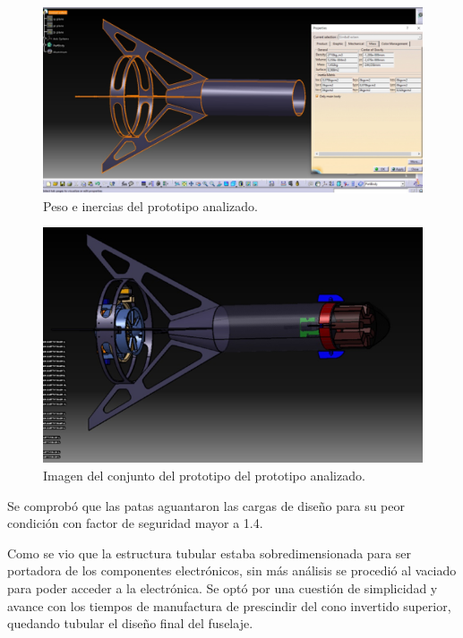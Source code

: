 \begin{figure}[htb]
    \centering
    \includegraphics[width=\linewidth]{fig/fea/inerciaspatas.png}
    \caption{Peso e inercias del prototipo analizado.}
    \label{fig:fea/patas4}
\end{figure}

\begin{figure}[htb]
    \centering
    \includegraphics[width=\linewidth]{fig/fea/imagenpatas.png}
    \caption{Imagen del conjunto del prototipo del prototipo analizado.}
    \label{fig:fea/imagenpatas}
\end{figure}

Se comprobó que las patas aguantaron las cargas de diseño para su peor condición con factor de seguridad mayor a 1.4.

Como se vio que la estructura tubular estaba sobredimensionada para ser portadora de los componentes electrónicos, sin más análisis se procedió al vaciado para poder acceder a la electrónica. Se optó por una cuestión de simplicidad y avance con los tiempos de manufactura de prescindir del cono invertido superior, quedando tubular el diseño final del fuselaje. 

